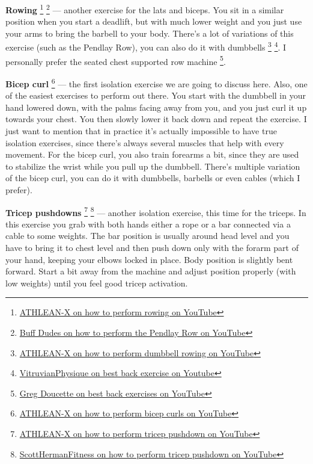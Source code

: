 \documentclass[openany, 12pt]{book}
\begin{document}
        \textbf{Rowing}
        \footnote{\href{https://www.youtube.com/watch?v=T3N-TO4reLQ}{ATHLEAN-X on how to perform rowing on YouTube}}
        \footnote{\href{https://www.youtube.com/watch?v=h4nkoayPFWw}{Buff Dudes on how to perform the Pendlay Row on YouTube}}
        --- another exercise for the lats and biceps. You sit in a similar position when you start a deadlift, but with much lower weight and you just use your arms to bring the barbell to your body.
        There's a lot of variations of this exercise (such as the Pendlay Row), you can also do it with dumbbells
        \footnote{\href{https://www.youtube.com/watch?v=EEFHHOCfHgw}{ATHLEAN-X on how to perform dumbbell rowing on YouTube}}
        \footnote{\href{https://www.youtube.com/watch?v=1G8czSqCqEA}{VitruvianPhysique on best back exercise on Youtube}}. I personally prefer the seated chest supported row machine
        \footnote{\href{https://www.youtube.com/watch?v=6_xDB8oMkKE}{Greg Doucette on best back exercises on YouTube}}.

        \textbf{Bicep curl}
        \footnote{\href{https://www.youtube.com/watch?v=yTWO2th-RIY}{ATHLEAN-X on how to perform bicep curls on YouTube}}
        --- the first isolation exercise we are going to discuss here. Also, one of the easiest exercises to perform out there. You start with the dumbbell in your hand lowered down, with the palms
        facing away from you, and you just curl it up towards your chest. You then slowly lower it back down and repeat the exercise.
        I just want to mention that in practice it's actually impossible to have true isolation exercises, since there's always several muscles that help
        with every movement. For the bicep curl, you also train forearms a bit, since they are used to stabilize the wrist while you pull up the dumbbell.
        There's multiple variation of the bicep curl, you can do it with dumbbells, barbells or even cables (which I prefer).

        \textbf{Tricep pushdowns}
        \footnote{\href{https://www.youtube.com/watch?v=REWv05om0ho}{ATHLEAN-X on how to perform tricep pushdown on YouTube}}
        \footnote{\href{https://www.youtube.com/watch?v=2-LAMcpzODU}{ScottHermanFitness on how to perform tricep pushdown on YouTube}}
        --- another isolation exercise, this time for the triceps. In this exercise you grab with both hands either a rope or a bar connected via a cable to some weights.
        The bar position is usually around head level and you have to bring it to chest level and then push down only with the
        forarm part of your hand, keeping your elbows locked in place. Body position is slightly bent forward. Start a bit away from the machine and adjust position properly (with low weights)
        until you feel good tricep activation.
\end{document}
